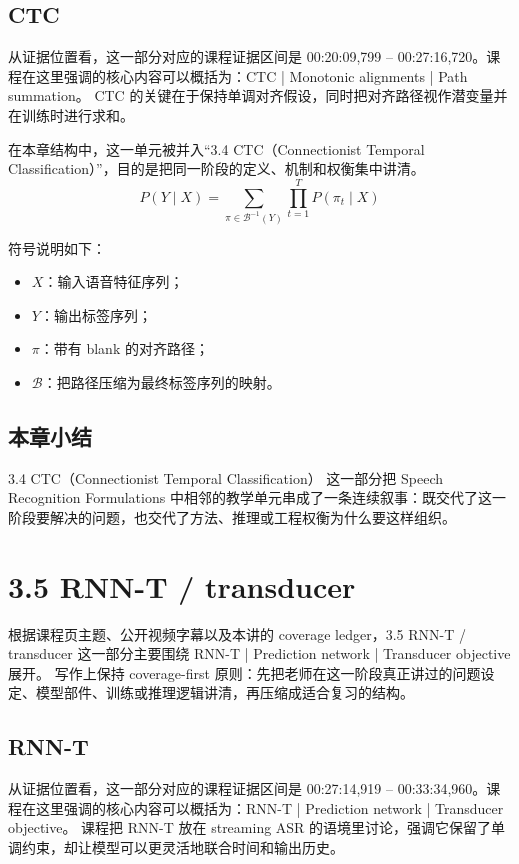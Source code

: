 \documentclass[a4paper]{article}
\begin{document}
\subsection{CTC}
从证据位置看，这一部分对应的课程证据区间是 00:20:09,799 -- 00:27:16,720。课程在这里强调的核心内容可以概括为：CTC | Monotonic alignments | Path summation。
CTC 的关键在于保持单调对齐假设，同时把对齐路径视作潜变量并在训练时进行求和。

在本章结构中，这一单元被并入“3.4 CTC（Connectionist Temporal Classification）”，目的是把同一阶段的定义、机制和权衡集中讲清。
\[
P(Y \mid X) = \sum_{\pi \in \mathcal{B}^{-1}(Y)} \prod_{t=1}^{T} P(\pi_t \mid X)
\]

符号说明如下：
\begin{itemize}
\item $X$：输入语音特征序列；
\item $Y$：输出标签序列；
\item $\pi$：带有 blank 的对齐路径；
\item $\mathcal{B}$：把路径压缩为最终标签序列的映射。
\end{itemize}

\subsection{本章小结}
3.4 CTC（Connectionist Temporal Classification） 这一部分把 Speech Recognition Formulations 中相邻的教学单元串成了一条连续叙事：既交代了这一阶段要解决的问题，也交代了方法、推理或工程权衡为什么要这样组织。

\section{3.5 RNN-T / transducer}
根据课程页主题、公开视频字幕以及本讲的 coverage ledger，3.5 RNN-T / transducer 这一部分主要围绕 RNN-T | Prediction network | Transducer objective 展开。
写作上保持 coverage-first 原则：先把老师在这一阶段真正讲过的问题设定、模型部件、训练或推理逻辑讲清，再压缩成适合复习的结构。

\subsection{RNN-T}
从证据位置看，这一部分对应的课程证据区间是 00:27:14,919 -- 00:33:34,960。课程在这里强调的核心内容可以概括为：RNN-T | Prediction network | Transducer objective。
课程把 RNN-T 放在 streaming ASR 的语境里讨论，强调它保留了单调约束，却让模型可以更灵活地联合时间和输出历史。
\end{document}
